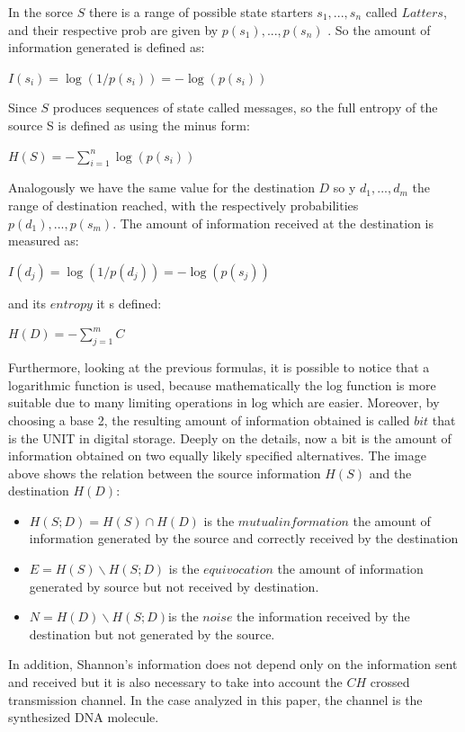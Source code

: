 \documentclass[10pt,twocolumn,twoside]{gsajnl}
\begin{document}
In the sorce $S$ there is a range of possible state starters $s_{1},..., s_{n}$ called $Latters$, and their respective prob are given by $p(s_{1}),...,p(s_{n})$ .
So the amount of information generated is defined as:
\begin{center}
$I(s_{i}) = \log(1/p(s_{i})) = - \log(p(s_{i}))$
\end{center}
Since $S$ produces sequences of state called messages, so the full entropy of the source S is defined as using the minus form:
\begin{center}
$ H(S) = - \sum_{i = 1}^{n} \log(p(s_{i}))$
\end{center}
Analogously we have the same value for the destination $D$ so y $d_{1},..., d_{m}$ the range of destination reached, with the respectively probabilities $p(d_{1}),...,p(s_{m})$. The amount of information received at the destination is measured as:
\begin{center}
$I(d_{j}) = \log(1/p(d_{j})) = - \log(p(s_{j}))$
\end{center}
and its $entropy$ it s defined:
\begin{center}
$ H(D) = - \sum_{j = 1}^{m} C$
\end{center}
Furthermore, looking at the previous formulas, it is possible to notice that a logarithmic function is used, because mathematically the log function is more suitable due to many limiting operations in log which are easier. Moreover, by choosing a base 2, the resulting amount of information obtained is called $bit$ that is the UNIT in digital storage.
Deeply on the details, now a bit is the amount of information obtained on two equally likely specified alternatives.
The image above shows the relation between the source information $H(S)$ and the destination $H(D)$:\\
\begin{itemize}
    \item $H(S;D)=H(S) \cap H(D)$ is the $mutual information$ the amount of information generated by the source and correctly received by the destination
    \item $E=H(S) \backslash H(S;D)$ is the $equivocation$ the amount of information generated by source but not received by destination.
    \item $N=H(D) \backslash H(S;D)$is the $noise$ the information received by the destination but not generated by the source.
\end{itemize}
In addition, Shannon's information does not depend only on the information sent and received but it is also necessary to take into account the $CH$ crossed transmission channel. In the case analyzed in this paper, the channel is the synthesized DNA molecule.
\end{document}
